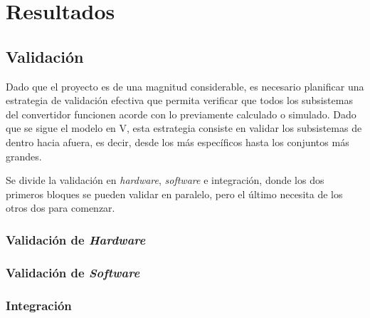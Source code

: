 \chapter{Resultados}

\section{Validación}
Dado que el proyecto es de una magnitud considerable, es necesario planificar una estrategia de validación efectiva que permita verificar que todos los subsistemas del convertidor funcionen acorde con lo previamente calculado o simulado. Dado que se sigue el modelo en V, esta estrategia consiste en validar los subsistemas de dentro hacia afuera, es decir, desde los más específicos hasta los conjuntos más grandes. 

Se divide la validación en \textit{hardware}, \textit{software} e integración, donde los dos primeros bloques se pueden validar en paralelo, pero el último necesita de los otros dos para comenzar.

\subsection{Validación de \textit{Hardware}}

\subsection{Validación de \textit{Software}}

\subsection{Integración}
